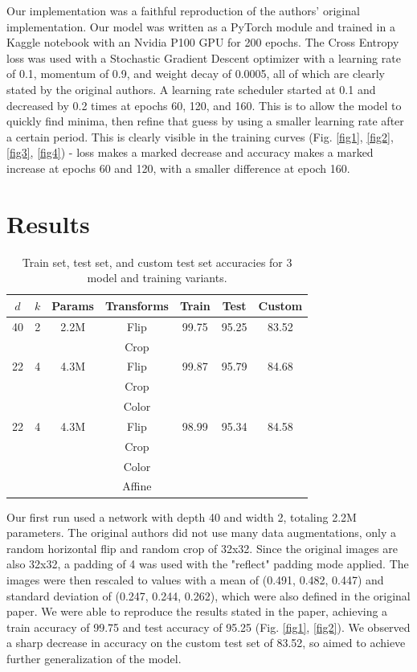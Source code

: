 \documentclass[letterpaper]{article} %
\begin{document}
Our implementation was a faithful reproduction of the authors' original implementation.  Our model was written as a PyTorch module and trained in a Kaggle notebook with an Nvidia P100 GPU for 200 epochs.  The Cross Entropy loss was used with a Stochastic Gradient Descent optimizer with a learning rate of 0.1, momentum of 0.9, and weight decay of 0.0005, all of which are clearly stated by the original authors.  A learning rate scheduler started at 0.1 and decreased by 0.2 times at epochs 60, 120, and 160.  This is to allow the model to quickly find minima, then refine that guess by using a smaller learning rate after a certain period.  This is clearly visible in the training curves (Fig. \ref{fig1}, \ref{fig2}, \ref{fig3}, \ref{fig4}) - loss makes a marked decrease and accuracy makes a marked increase at epochs 60 and 120, with a smaller difference at epoch 160.

\section{Results}

\begin{table}[t]
\centering
\begin{tabular}{|c|c|c|c|c|c|c|}
    \hline
    $d$ & $k$ & Params & Transforms & Train & Test & Custom \\
    \hline
    40 & 2 & 2.2M & Flip & 99.75 & 95.25 & 83.52 \\
    & & & Crop & & & \\
    22 & 4 & 4.3M & Flip & 99.87 & 95.79 & 84.68 \\
    & & & Crop & & & \\
    & & & Color & & & \\
    22 & 4 & 4.3M & Flip & 98.99 & 95.34 & 84.58 \\
    & & & Crop & & & \\
    & & & Color & & & \\
    & & & Affine & & & \\
    \hline
\end{tabular}
\caption{Train set, test set, and custom test set accuracies for 3 model and training variants.}
\label{table1}
\end{table}

Our first run used a network with depth 40 and width 2, totaling 2.2M parameters.  The original authors did not use many data augmentations, only a random horizontal flip and random crop of 32x32.  Since the original images are also 32x32, a padding of 4 was used with the "reflect" padding mode applied.  The images were then rescaled to values with a mean of (0.491, 0.482, 0.447) and standard deviation of (0.247, 0.244, 0.262), which were also defined in the original paper.  We were able to reproduce the results stated in the paper, achieving a train accuracy of 99.75 and test accuracy of 95.25 (Fig. \ref{fig1}, \ref{fig2}).  We observed a sharp decrease in accuracy on the custom test set of 83.52, so aimed to achieve further generalization of the model.
\end{document}
